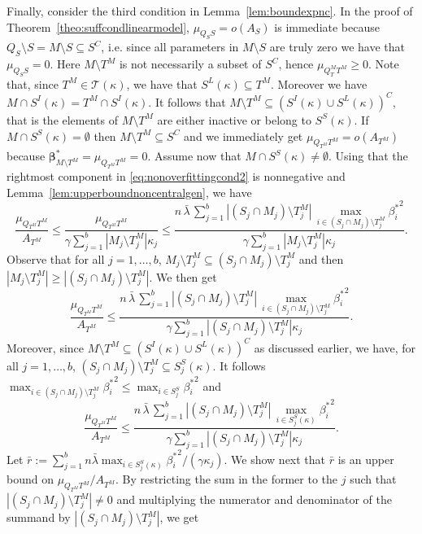 \documentclass[bj,authoryear]{imsart}
\theoremstyle{plain}
\newcommand{\T}{\mathcal{T}}
\newcommand{\bs}{\boldsymbol}
\begin{document}
Finally, consider the third condition in Lemma~\ref{lem:boundexpnc}.
In the proof of Theorem~\ref{theo:suffcondlinearmodel}, $\mu_{Q_SS}=o(A_S)$ is immediate because $ Q_S \setminus S= M\setminus S\subseteq S^C$, i.e. since all parameters in $M \setminus S$ are truly zero we have that $\mu_{Q_SS}=0$.
Here $M\setminus T^M$ is not necessarily a subset of $S^C$, hence $\mu_{Q_T^M T^M} \geq 0$. Note that, since $T^M\in\T(\kappa)$, we have that $S^L(\kappa)\subseteq T^M$. Moreover we have $M\cap S^{I}(\kappa)=T^M\cap S^{I}(\kappa)$. It follows that $M\setminus T^M\subseteq (S^{I}(\kappa) \cup S^L(\kappa))^C$, that is the elements of $M\setminus T^M$ are either inactive or belong to $S^S(\kappa)$. If $M\cap S^{S}(\kappa)=\emptyset$ then $M\setminus T^M\subseteq S^C$ and we immediately get $\mu_{Q_{T^M} T^M}=o(A_{T^M})$ because $\bs\beta^*_{M \setminus T^M}=\mu_{Q_{T^M} T^M}=0$. Assume now that $M\cap S^{S}(\kappa)\neq\emptyset$. Using that the rightmost component in \eqref{eq:nonoverfittingcond2} is nonnegative and Lemma~\ref{lem:upperboundnoncentralgen}, we have
$$\frac{\mu_{Q_{T^M} T^M}}{ A_{T^M}} \leq \frac{\mu_{Q_{T^M} T^M}}{ \gamma\sum_{j=1}^b|M_j \setminus T^M_j|\kappa_j} \leq \frac{n\,\bar{\lambda}\,\sum_{j=1}^b|(S_j\cap M_j )\setminus T^M_j|\,\max_{i\in (S_j\cap M_j )\setminus T^M_j}{\beta_{i}^*}^2}{ \gamma\sum_{j=1}^b|M_j \setminus T^M_j|\kappa_j}.$$
Observe that for all $j=1,\ldots,b$, $M_j \setminus T^M_j \subseteq (S_j\cap M_j )\setminus T^M_j$ and then $|M_j \setminus T^M_j| \geq |(S_j\cap M_j )\setminus T^M_j|$. We then get
$$\frac{\mu_{Q_{T^M} T^M}}{ A_{T^M}} \leq \frac{n\,\bar{\lambda}\,\sum_{j=1}^b|(S_j\cap M_j )\setminus T^M_j|\,\max_{i\in(S_j\cap M_j )\setminus T^M_j}{\beta_{i}^*}^2}{ \gamma\sum_{j=1}^b|(S_j\cap M_j ) \setminus T^M_j|\kappa_j}.$$
Moreover, since  $M\setminus T^M\subseteq (S^{I}(\kappa) \cup S^L(\kappa))^C$ as discussed earlier, we have, for all $j=1,\ldots,b$, $(S_j\cap M_j )\setminus T^M_j \subseteq S^{S}_j(\kappa)$. It follows $\max_{i\in(S_j\cap M_j )\setminus T^M_j}{\beta_{i}^*}^2 \leq \max_{i\in S_j^S}{\beta_{i}^*}^2$ and
\begin{equation}\label{eq:onbfsa}
  \frac{\mu_{Q_{T^M} T^M}}{ A_{T^M}} \leq \frac{n\,\bar{\lambda}\,\sum_{j=1}^b|(S_j\cap M_j )\setminus T^M_j|\,\max_{i\in S^{S}_j(\kappa)}{\beta_{i}^*}^2}{ \gamma\sum_{j=1}^b|(S_j\cap M_j ) \setminus T^M_j|\kappa_j}.  
\end{equation}
Let $\bar{r}:=\sum_{j=1}^b n\bar{\lambda}\max_{i\in S^{S}_j(\kappa)}{\beta_i^*}^2/(\gamma\kappa_j)$. We show next that $\bar{r}$ is an upper bound on $\mu_{Q_{T^M} T^M}/ A_{T^M}$. By restricting the sum in the former to the $j$ such that $|(S_j\cap M_j )\setminus T^M_j|\neq 0$ and multiplying the numerator and denominator of the summand by $|(S_j\cap M_j )\setminus T^M_j|$, we get 
\end{document}
